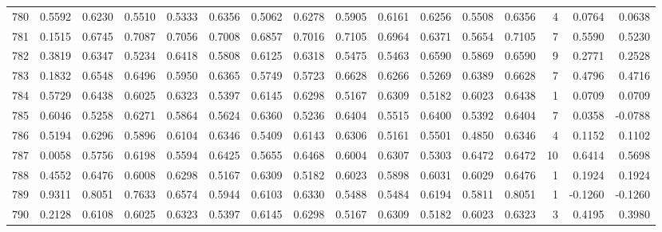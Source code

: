 \begin{tabular}{lrrrrrrrrrrrrrrr}
780 &      0.5592 &  0.6230 &  0.5510 &  0.5333 &  0.6356 &  0.5062 &  0.6278 &  0.5905 &  0.6161 &  0.6256 &   0.5508 &     0.6356 &      4 &                    0.0764 &                     0.0638 \\
781 &      0.1515 &  0.6745 &  0.7087 &  0.7056 &  0.7008 &  0.6857 &  0.7016 &  0.7105 &  0.6964 &  0.6371 &   0.5654 &     0.7105 &      7 &                    0.5590 &                     0.5230 \\
782 &      0.3819 &  0.6347 &  0.5234 &  0.6418 &  0.5808 &  0.6125 &  0.6318 &  0.5475 &  0.5463 &  0.6590 &   0.5869 &     0.6590 &      9 &                    0.2771 &                     0.2528 \\
783 &      0.1832 &  0.6548 &  0.6496 &  0.5950 &  0.6365 &  0.5749 &  0.5723 &  0.6628 &  0.6266 &  0.5269 &   0.6389 &     0.6628 &      7 &                    0.4796 &                     0.4716 \\
784 &      0.5729 &  0.6438 &  0.6025 &  0.6323 &  0.5397 &  0.6145 &  0.6298 &  0.5167 &  0.6309 &  0.5182 &   0.6023 &     0.6438 &      1 &                    0.0709 &                     0.0709 \\
785 &      0.6046 &  0.5258 &  0.6271 &  0.5864 &  0.5624 &  0.6360 &  0.5236 &  0.6404 &  0.5515 &  0.6400 &   0.5392 &     0.6404 &      7 &                    0.0358 &                    -0.0788 \\
786 &      0.5194 &  0.6296 &  0.5896 &  0.6104 &  0.6346 &  0.5409 &  0.6143 &  0.6306 &  0.5161 &  0.5501 &   0.4850 &     0.6346 &      4 &                    0.1152 &                     0.1102 \\
787 &      0.0058 &  0.5756 &  0.6198 &  0.5594 &  0.6425 &  0.5655 &  0.6468 &  0.6004 &  0.6307 &  0.5303 &   0.6472 &     0.6472 &     10 &                    0.6414 &                     0.5698 \\
788 &      0.4552 &  0.6476 &  0.6008 &  0.6298 &  0.5167 &  0.6309 &  0.5182 &  0.6023 &  0.5898 &  0.6031 &   0.6029 &     0.6476 &      1 &                    0.1924 &                     0.1924 \\
789 &      0.9311 &  0.8051 &  0.7633 &  0.6574 &  0.5944 &  0.6103 &  0.6330 &  0.5488 &  0.5484 &  0.6194 &   0.5811 &     0.8051 &      1 &                   -0.1260 &                    -0.1260 \\
790 &      0.2128 &  0.6108 &  0.6025 &  0.6323 &  0.5397 &  0.6145 &  0.6298 &  0.5167 &  0.6309 &  0.5182 &   0.6023 &     0.6323 &      3 &                    0.4195 &                     0.3980 \\

\end{tabular}
